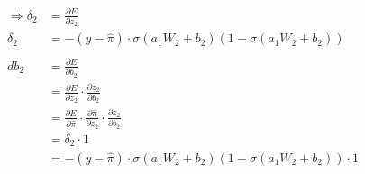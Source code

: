 \begin{align*}
\Rightarrow \delta_{2} &= \frac{\partial E}{\partial z_{2}}\\
\delta_{2} &= -(y-\hat{\pi}) \cdot \sigma(a_{1}W_{2}+b_{2})(1-\sigma(a_{1}W_{2}+b_{2}))\\\\
db_{2} &= \frac{\partial E}{\partial b_{2}}\\
&=\frac{\partial E}{\partial z_{2}} \cdot \frac{\partial z_{2}}{\partial b_{2}}\\
&= \frac{\partial E}{\partial\hat{\pi}} \cdot \frac{\partial \hat{\pi}}{\partial z_{2}} \cdot \frac{\partial z_{2}}{\partial b_{2}}\\
&= \delta_{2} \cdot 1\\
&= -(y-\hat{\pi}) \cdot \sigma(a_{1}W_{2}+b_{2})(1-\sigma(a_{1}W_{2}+b_{2})) \cdot 1\\\\

\end{align*}

